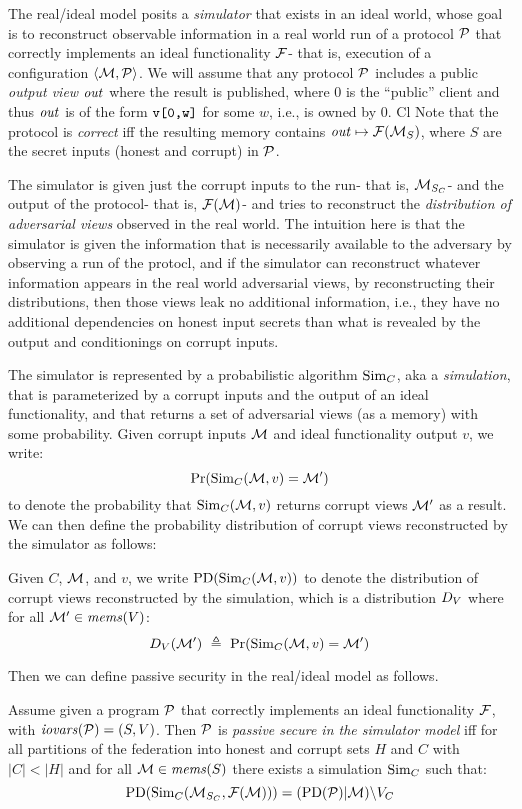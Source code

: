 The real/ideal model posits a \emph{simulator} that exists in an ideal
world, whose goal is to reconstruct observable information in a real
world run of a protocol $\mathcal{P}$ that correctly implements an ideal
functionality $\mathcal{F}$- that is, execution of a configuration
$\langle \mathcal{M},\mathcal{P} \rangle$. We will assume that any protocol $\mathcal{P}$
includes a public \emph{output view} $\mathit{out}$ where the result is
published, where $0$ is the ``public'' client and thus $\mathit{out}$
is of the form $\texttt{v[0,w]}$ for some $w$, i.e., is owned by 0.
Cl
Note that the protocol is \emph{correct} iff the resulting
memory contains $\mathit{out} \mapsto \mathcal{F}(\mathcal{M}_S)$, where $S$ are the
secret inputs (honest and corrupt) in $\mathcal{P}$.

The simulator is given just the corrupt inputs to the run- that is,
$\mathcal{M}_{S_C}$- and the output of the protocol- that is,
$\mathcal{F}(\mathcal{M})$- and tries to reconstruct the \emph{distribution of
adversarial views} observed in the real world. The intuition here is
that the simulator is given the information that is necessarily
available to the adversary by observing a run of the protocl, and if
the simulator can reconstruct whatever information appears in the real
world adversarial views, by reconstructing their distributions, then
those views leak no additional information, i.e., they have no
additional dependencies on honest input secrets than what is revealed
by the output and conditionings on corrupt inputs.

The simulator is represented by a probabilistic algorithm $\mathrm{Sim}_C$,
aka a \emph{simulation}, that is parameterized by a corrupt inputs and
the output of an ideal functionality, and that returns a set of
adversarial views (as a memory) with some probability. Given
corrupt inputs $\mathcal{M}$ and ideal functionality output $v$,  
we write:
$$
\mathrm{Pr}(\mathrm{Sim}_C(\mathcal{M},v) = \mathcal{M}')
$$
to denote the probability that $\mathrm{Sim}_C(\mathcal{M},v)$
returns corrupt views $\mathcal{M}'$ as a result. We can then define the
probability distribution of corrupt views reconstructed
by the simulator as follows:
\begin{definition}
  Given $C$, $\mathcal{M}$, and $v$, we write $\mathrm{PD}(\mathrm{Sim}_C(\mathcal{M},v))$ to
  denote the distribution of corrupt views reconstructed by the
  simulation, which is a distribution $D_{V}$ where for
  all $\mathcal{M}' \in \mathit{mems}(V)$:
  $$
  D_{V}(\mathcal{M}')\ \triangleq\ \mathrm{Pr}(\mathrm{Sim}_C(\mathcal{M},v) = \mathcal{M}') 
  $$
\end{definition}

Then we can define passive security in the real/ideal
model as follows. 
\begin{definition}
  Assume given a program $\mathcal{P}$ that correctly implements an ideal
  functionality $\mathcal{F}$, with $\mathit{iovars}(\mathcal{P}) = (S,V)$.  Then $\mathcal{P}$
  is \emph{passive secure in the simulator model} iff for all
  partitions of the federation into honest and corrupt sets $H$ and $C$
  with $|C| < |H|$ and for all $\mathcal{M} \in \mathit{mems}(S)$ there exists a
  simulation $\mathrm{Sim}_C$ such that:
  $$
  \mathrm{PD}(\mathrm{Sim}_C(\mathcal{M}_{S_C},\mathcal{F}(\mathcal{M}))) = (\mathrm{PD}(\mathcal{P})|\mathcal{M})\backslash V_C
  $$
\end{definition}

